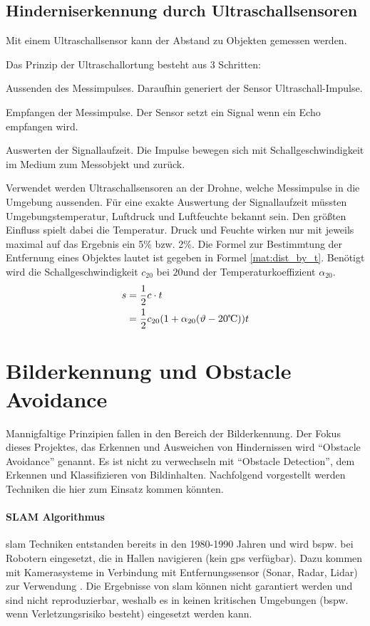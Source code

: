 \subsection{Hinderniserkennung durch Ultraschallsensoren}\label{chap:ultrasonic}
Mit einem Ultraschallsensor kann der Abstand zu Objekten gemessen werden. 

Das Prinzip der Ultraschallortung besteht aus 3 Schritten:
\begin{compactenum}
	\item Aussenden des Messimpulses. Daraufhin generiert der Sensor Ultraschall-Impulse.
	\item Empfangen der Messimpulse. Der Sensor setzt ein Signal wenn ein Echo empfangen wird.
	\item Auswerten der Signallaufzeit. Die Impulse bewegen sich mit Schallgeschwindigkeit im Medium zum Messobjekt und zurück.
\end{compactenum}

Verwendet werden Ultraschallsensoren an der Drohne, welche Messimpulse in die Umgebung aussenden. Für eine exakte Auswertung der Signallaufzeit müssten Umgebungstemperatur, Luftdruck und Luftfeuchte bekannt sein. Den größten Einfluss spielt dabei die Temperatur. Druck und Feuchte wirken nur mit jeweils maximal auf das Ergebnis ein 5\% bzw. 2\%.\newline
Die Formel zur Bestimmtung der Entfernung eines Objektes lautet ist gegeben in Formel \ref{mat:dist_by_t}. Benötigt wird die Schallgeschwindigkeit $c_{20}$ bei $20$\textcelsius und der Temperaturkoeffizient $\alpha_{20}$\cite[Seite 152]{grudenSensorikUndMesswertverarbeitung2022}.
\begin{align}
	s &=\frac{1}{2}c\cdot t\\
	&=\frac{1}{2}c_{20}(1+\alpha_{20}(\vartheta-20\textrm{\textcelsius})) t	\label{mat:dist_by_t}
\end{align}

\section{Bilderkennung und Obstacle Avoidance}
Mannigfaltige Prinzipien fallen in den Bereich der Bilderkennung. Der Fokus dieses Projektes, das Erkennen und Ausweichen von Hindernissen wird \enquote{Obstacle Avoidance} genannt. Es ist nicht zu verwechseln mit \enquote{Obstacle Detection}, dem Erkennen und Klassifizieren von Bildinhalten. Nachfolgend vorgestellt werden Techniken die hier zum Einsatz kommen könnten. 
\paragraph*{SLAM Algorithmus}\label{chap:slam}
\Gls{slam} Techniken entstanden bereits in den 1980-1990 Jahren und wird bspw. bei Robotern eingesetzt, die in Hallen navigieren (kein \gls{gps} verfügbar). Dazu kommen mit Kamerasysteme in Verbindung mit Entfernungssensor (Sonar, Radar, Lidar) zur Verwendung . Die Ergebnisse von \gls{slam} können nicht garantiert werden und sind nicht reproduzierbar, weshalb es in keinen kritischen Umgebungen (bspw. wenn Verletzungsrisiko besteht) eingesetzt werden kann.

